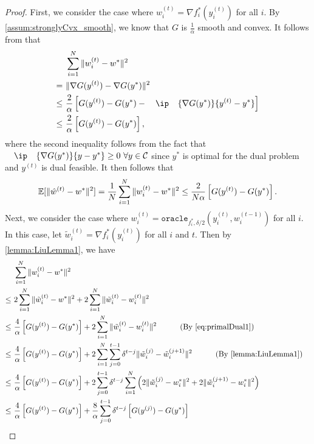 \begin{proof}
    First, we consider the case where $w_i^{(t)} = \nabla f_i^*(y_i^{(t)})$ for all $i$. By \autoref{assum:stronglyCvx_smooth}, we know that $G$ is $\frac{1}{\alpha}$ smooth and convex. It follows from \citep[Theorem~2.1.5]{cvxopt_lecture} that 
    \begin{equation} \label{eq:primalDual1}
    \begin{split}
        &\sum_{i=1}^N \|w_i^{(t)} - w^*\|^2 \\
        =~& \| \nabla G( y^{(t)} ) - \nabla G(y^*) \|^2\\
        \leq~& \frac{2}{\alpha} \left[G(y^{(t)}) - G(y^*) -  \ip{\nabla G(y^*)}{y^{(t)} - y^*}\right] \\
        \leq~& \frac{2}{\alpha} \left[G(y^{(t)}) - G(y^*) \right],
    \end{split}
    \end{equation}
    where the second inequality follows from the fact that $\ip{\nabla G(y^*)}{y - y^*} \geq 0~\forall y \in \Cscr $ since $y^*$ is optimal for the dual problem and $y^{(t)}$ is dual feasible. It then follows that 
    \[\mathbb{E}[\|\hat w^{(t)} - w^*\|^2] = \frac{1}{N}\sum_{i=1}^N \|w_i^{(t)} - w^*\|^2 \leq \frac{2}{N\alpha} \left[G(y^{(t)}) - G(y^*) \right].\]
    Next, we consider the case where $w_i^{(t)} = \texttt{oracle}_{f_i^*, \delta/2}(y^{(t)}_i, w_{i}^{(t-1)})$ for all $i$. In this case, let $\tilde w_i^{(t)} = \nabla f_i^*(y_i^{(t)})$ for all $i$ and $t$. Then by \autoref{lemma:LiuLemma1}, we have 
    \begin{align*}
        & \sum_{i=1}^N \|w_i^{(t)} - w^*\|^2 
        \\\leq~& 2\sum_{i=1}^N \|\tilde w_i^{(t)} - w^*\|^2 + 2\sum_{i=1}^N \|\tilde w_i^{(t)} - w_i^{(t)}\|^2
        \\\leq~& \frac{4}{\alpha}\left[G(y^{(t)}) - G(y^*) \right] + 2\sum_{i=1}^N \|\tilde w_i^{(t)} - w_i^{(t)}\|^2 \qquad \text{(By \eqref{eq:primalDual1})}
        \\\leq~& \frac{4}{\alpha}\left[G(y^{(t)}) - G(y^*) \right] + 2 \sum_{i=1}^N \sum_{j=0}^{t-1}\delta^{t-j}\|\tilde w_i^{(j)} - \tilde w_i^{(j+1)}\|^2 \qquad \text{(By \autoref{lemma:LiuLemma1})}
        \\\leq~& \frac{4}{\alpha}\left[G(y^{(t)}) - G(y^*) \right] + 2  \sum_{j=0}^{t-1}\delta^{t-j} \sum_{i=1}^N \left( 2\|\tilde w_i^{(j)} -  w_i^{*}\|^2 + 2 \|\tilde w_i^{(j+1)} -  w_i^{*}\|^2 \right)
        \\\leq~& \frac{4}{\alpha}\left[G(y^{(t)}) - G(y^*) \right] + \frac{8}{\alpha} \sum_{j=0}^{t-1} \delta^{t-j}\left[G(y^{(j)}) - G(y^*) \right] 

\end{align*}
\end{proof}

